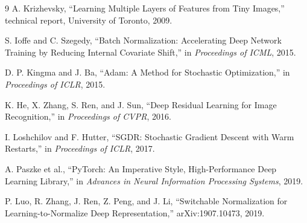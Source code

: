 \documentclass[10pt]{article}
\begin{document}
\begin{thebibliography}{9}
A. Krizhevsky, ``Learning Multiple Layers of Features from Tiny Images,'' technical report, University of Toronto, 2009.

S. Ioffe and C. Szegedy, ``Batch Normalization: Accelerating Deep Network Training by Reducing Internal Covariate Shift,'' in \emph{Proceedings of ICML}, 2015.

D. P. Kingma and J. Ba, ``Adam: A Method for Stochastic Optimization,'' in \emph{Proceedings of ICLR}, 2015.

K. He, X. Zhang, S. Ren, and J. Sun, ``Deep Residual Learning for Image Recognition,'' in \emph{Proceedings of CVPR}, 2016.

I. Loshchilov and F. Hutter, ``SGDR: Stochastic Gradient Descent with Warm Restarts,'' in \emph{Proceedings of ICLR}, 2017.

A. Paszke et al., ``PyTorch: An Imperative Style, High-Performance Deep Learning Library,'' in \emph{Advances in Neural Information Processing Systems}, 2019.

P. Luo, R. Zhang, J. Ren, Z. Peng, and J. Li, ``Switchable Normalization for Learning-to-Normalize Deep Representation,'' arXiv:1907.10473, 2019.

\end{thebibliography}
\end{document}
